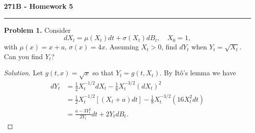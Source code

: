 \documentclass[11pt,letterpaper]{report}
\newenvironment{solution}
{\begin{proof}[Solution]}
{\end{proof}}
\begin{document}
\begin{center}
{\bf \Large 271B - Homework 5}
\vspace{0.2cm}
\hrule
\end{center}

\noindent\textbf{Problem 1. }
Consider
\begin{equation}\label{sde}
dX_t = \mu(X_t)dt + \sigma(X_t)dB_t,\quad X_0 = 1,
\end{equation}
with $\mu(x) = x+a$, $\sigma(x) = 4x$. Assuming $X_t > 0$, find $dY_t$ when $Y_t = \sqrt{X_t}$. Can you find $Y_t$?
\begin{solution}
	Let $g(t, x) = \sqrt{x}$ so that $Y_t = g(t, X_t)$. By It\^o's lemma we have
	\begin{align*}
		dY_t &= \frac{1}{2}X_t^{-1/2}dX_t - \frac{1}{8}X_{t}^{-3/2}(dX_t)^2\\
		&= \frac{1}{2}X_t^{-1/2}[(X_t+a)dt] - \frac{1}{8}X_t^{-3/2}(16X_t^2dt)\\
		&= \frac{a-3Y_t^2}{2Y_t}dt + 2Y_tdB_t.
	\end{align*}
	
\end{solution}
\end{document}
